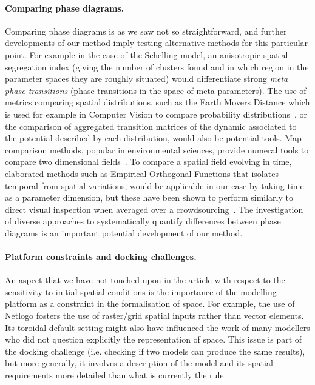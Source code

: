 \documentclass[3p,times,procedia]{elsarticle}
\begin{document}
\paragraph{Comparing phase diagrams.} Comparing phase diagrams is as we saw not so straightforward, and further developments of our method imply testing alternative methods for this particular point. For example in the case of the Schelling model, an anisotropic spatial segregation index (giving the number of clusters found and in which region in the parameter spaces they are roughly situated) would differentiate strong \emph{meta phase transitions} (phase transitions in the space of meta parameters). The use of metrics comparing spatial distributions, such as the Earth Movers Distance which is used for example in Computer Vision to compare probability distributions~\citep{rubner2000earth}, or the comparison of aggregated transition matrices of the dynamic associated to the potential described by each distribution, would also be potential tools. Map comparison methods, popular in environmental sciences, provide numeral tools to compare two dimensional fields~\citep{visser2006map}. To compare a spatial field evolving in time, elaborated methods such as Empirical Orthogonal Functions that isolates temporal from spatial variations, would be applicable in our case by taking time as a parameter dimension, but these have been shown to perform similarly to direct visual inspection when averaged over a crowdsourcing~\citep{10.1371/journal.pone.0178165}. The investigation of diverse approaches to systematically quantify differences between phase diagrams is an important potential development of our method.


\paragraph{Platform constraints and docking challenges.} An aspect that we have not touched upon in the article with respect to the sensitivity to initial spatial conditions is the importance of the modelling platform as a constraint in the formalisation of space. For example, the use of Netlogo fosters the use of raster/grid spatial inputs rather than vector elements. Its toroidal default setting might also have influenced the work of many modellers who did not question explicitly the representation of space. This issue is part of the docking challenge \citep{Axtelletal1996} (i.e. checking if two models can produce the same results), but more generally, it involves a description of the model and its spatial requirements more detailed than what is currently the rule.
\end{document}
